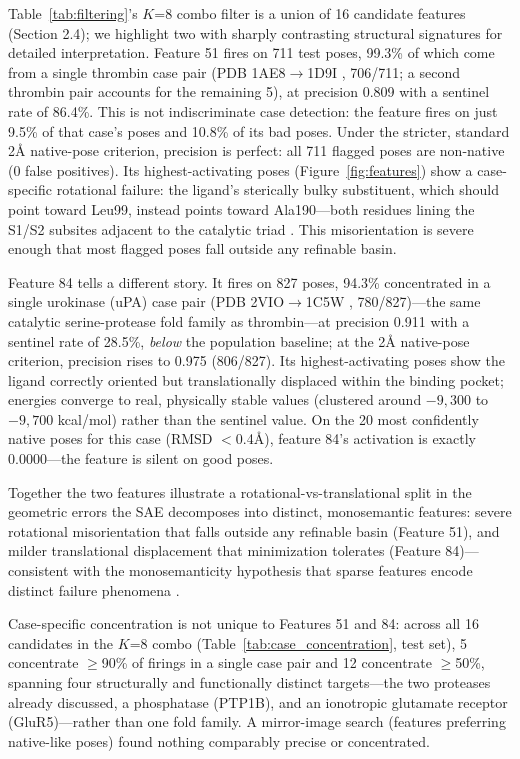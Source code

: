 \documentclass{article}
\begin{document}
Table~\ref{tab:filtering}'s $K$=8 combo filter is a union of 16 candidate features (Section 2.4); we highlight two with sharply contrasting structural signatures for detailed interpretation. Feature 51 fires on 711 test poses, 99.3\% of which come from a single thrombin case pair \citep{dicera1995} (PDB 1AE8$\to$1D9I \citep{desimone1997,krishnan2000}, 706/711; a second thrombin pair accounts for the remaining 5), at precision 0.809 with a sentinel rate of 86.4\%. This is not indiscriminate case detection: the feature fires on just 9.5\% of that case's poses and 10.8\% of its bad poses. Under the stricter, standard 2Å native-pose criterion, precision is perfect: all 711 flagged poses are non-native (0 false positives). Its highest-activating poses (Figure~\ref{fig:features}) show a case-specific rotational failure: the ligand's sterically bulky substituent, which should point toward Leu99, instead points toward Ala190---both residues lining the S1/S2 subsites adjacent to the catalytic triad \citep{bode1989}. This misorientation is severe enough that most flagged poses fall outside any refinable basin.

Feature 84 tells a different story. It fires on 827 poses, 94.3\% concentrated in a single urokinase (uPA) case pair \citep{spraggon1995} (PDB 2VIO$\to$1C5W \citep{frederickson2008,katz2000}, 780/827)---the same catalytic serine-protease fold family as thrombin---at precision 0.911 with a sentinel rate of 28.5\%, \emph{below} the population baseline; at the 2Å native-pose criterion, precision rises to 0.975 (806/827). Its highest-activating poses show the ligand correctly oriented but translationally displaced within the binding pocket; energies converge to real, physically stable values (clustered around $-9{,}300$ to $-9{,}700$ kcal/mol) rather than the sentinel value. On the 20 most confidently native poses for this case (RMSD $<$0.4Å), feature 84's activation is exactly 0.0000---the feature is silent on good poses.

Together the two features illustrate a rotational-vs-translational split in the geometric errors the SAE decomposes into distinct, monosemantic features: severe rotational misorientation that falls outside any refinable basin (Feature 51), and milder translational displacement that minimization tolerates (Feature 84)---consistent with the monosemanticity hypothesis that sparse features encode distinct failure phenomena \citep{templeton2024,adams2025,clark2026,bricken2023}.

Case-specific concentration is not unique to Features 51 and 84: across all 16 candidates in the $K$=8 combo (Table~\ref{tab:case_concentration}, test set), 5 concentrate $\geq$90\% of firings in a single case pair and 12 concentrate $\geq$50\%, spanning four structurally and functionally distinct targets---the two proteases already discussed, a phosphatase (PTP1B), and an ionotropic glutamate receptor (GluR5)---rather than one fold family. A mirror-image search (features preferring native-like poses) found nothing comparably precise or concentrated.
\end{document}
